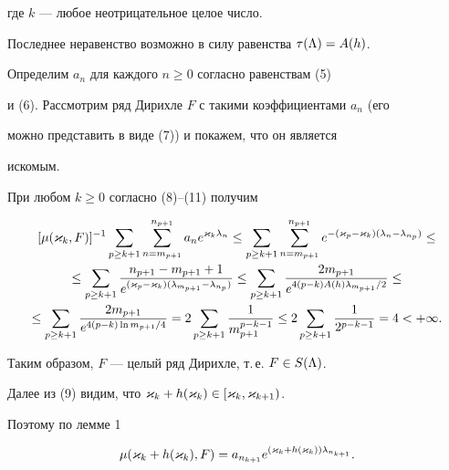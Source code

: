 где $k$ --- любое неотрицательное целое число. 


Последнее неравенство возможно в силу равенства $\tau(\Lambda)=A(h)$.





Определим $a_n$ для каждого $n\ge 0$ согласно равенствам (5)


и (6). Рассмотрим ряд Дирихле $F$ с такими коэффициентами $a_n$ (его


можно представить в виде (7)) и покажем, что он является


искомым. 





При любом $k\ge 0$ согласно (8)--(11) получим


\begin{gather*}


[\mu(\k_k,F)]^{-1}\sum_{p\ge k+1}\sum_{n=m_{p+1}}^{n_{p+1}}a_ne^{\k_k\l_n}\le


\sum_{p\ge k+1}


\sum_{n=m_{p+1}}^{n_{p+1}}e^{-(\k_p-\k_k)(\l_n-\l_{n_p})}\le\\


%


\le\sum_{p\ge k+1}\frac{n_{p+1}-m_{p+1}+1}


{e^{(\k_p-\k_k)(\l_{m_{p+1}}-\l_{n_p})}}\le


\sum_{p\ge k+1}\frac{2m_{p+1}}


{e^{4(p-k)A(h)\l_{m_{p+1}}/2}}\le\\


%


\le\sum_{p\ge k+1}\frac{2m_{p+1}}


{e^{4(p-k)\ln m_{p+1}/4}}=2\sum_{p\ge


k+1}\frac1{m_{p+1}^{p-k-1}}\le


2\sum_{p\ge k+1}\frac1{2^{p-k-1}}=4<+\i.


\end{gather*}


Таким образом, $F$ --- целый ряд Дирихле, т.\,е. $F\in S(\Lambda)$.





Далее из (9) видим, что $\varkappa_k+h(\varkappa_k)\in [\varkappa_k,\varkappa_{k+1})$.


Поэтому по лемме 1  


$$


\mu(\k_k+h(\k_k),F)=a_{n_{k+1}}e^{(\k_k+h(\k_k))\l_{n_{k+1}}}.


$$


